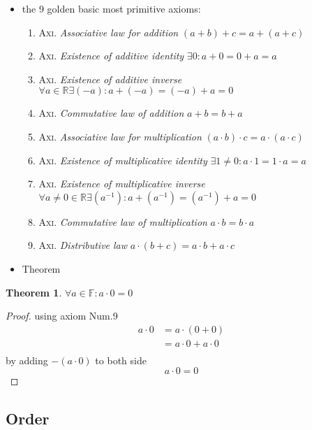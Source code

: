 \documentclass[11pt, a4paper]{article}
\newtheorem{theorem}{Theorem}
\begin{document}
\begin{itemize}
\item the 9 golden basic most primitive axioms:
\begin{enumerate}
\item \textsc{Axi}. \emph{Associative law for addition} \(( a + b) + c = a + ( a + c )\)
\item \textsc{Axi}. \emph{Existence of additive identity} \(\exists 0:  a + 0 = 0 + a = a\)
\item \textsc{Axi}. \emph{Existence of additive inverse} \(\forall a \in \mathbb{R} \exists (-a) : a + (-a) = (-a) + a = 0\)
\item \textsc{Axi}. \emph{Commutative law of addition} \(a + b = b + a\)
\item \textsc{Axi}. \emph{Associative law for multiplication} \(( a \cdot b) \cdot c = a \cdot ( a \cdot c )\)
\item \textsc{Axi}. \emph{Existence of multiplicative identity} \(\exists 1 \neq 0:  a \cdot 1 = 1 \cdot a = a\)
\item \textsc{Axi}. \emph{Existence of multiplicative inverse} \(\forall a \neq 0 \in \mathbb{R} \exists (a^{-1}) : a + (a^{-1}) = (a^{-1}) + a = 0\)
\item \textsc{Axi}. \emph{Commutative law of multiplication} \(a \cdot b = b \cdot a\)
\item \textsc{Axi}. \emph{Distributive law} \(a \cdot ( b + c ) = a \cdot b + a \cdot c\)
\end{enumerate}

\item Theorem
\end{itemize}

\begin{theorem}
  $ \forall a \in \mathbb{F}: a \cdot 0 = 0 $
\end{theorem}

\begin{proof}
  using axiom Num.9
  \begin{align*}
    a \cdot 0 &= a \cdot (0 + 0) \\
          &= a \cdot 0 + a \cdot 0 \\
  \end{align*}
by adding $-(a \cdot 0)$ to both side
\[ a \cdot 0 = 0 \]
\end{proof}
\subsection{Order}
\label{sec:orgefcb8ad}
\end{document}
